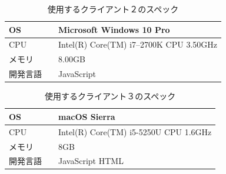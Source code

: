 \begin{table}[htbp]
\begin{center}
	\caption{使用するクライアント２のスペック}
	\begin{tabular}{|l|l|} \hline
		OS & Microsoft Windows 10 Pro \\ \hline
		CPU & Intel(R) Core(TM) i7--2700K CPU 3.50GHz \\ \hline
		メモリ & 8.00GB \\ \hline
    開発言語　& JavaScript \\ \hline
	\end{tabular}
	\label{1_client2}
\end{center}
\end{table}



\begin{table}[htbp]
\begin{center}
	\caption{使用するクライアント３のスペック}
	\begin{tabular}{|l|l|} \hline
		OS & macOS Sierra \\ \hline
		CPU & Intel(R) Core(TM) i5-5250U CPU 1.6GHz \\ \hline
		メモリ & 8GB \\ \hline
    開発言語　& JavaScript HTML \\ \hline
	\end{tabular}
	\label{1_client3}
\end{center}
\end{table}

